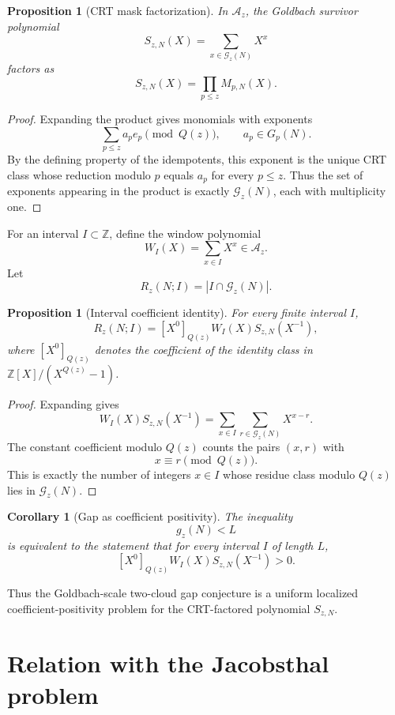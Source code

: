 \documentclass[11pt]{article}
\theoremstyle{plain}
\newtheorem{proposition}[theorem]{Proposition}
\newtheorem{corollary}[theorem]{Corollary}
\theoremstyle{definition}
\theoremstyle{remark}
\newcommand{\Z}{\mathbb Z}
\newcommand{\G}{\mathcal G}
\newcommand{\A}{\mathcal A}
\begin{document}
\begin{proposition}[CRT mask factorization]
\label{prop:mask_factorization}
In \(\A_z\), the Goldbach survivor polynomial
\[
S_{z,N}(X)=\sum_{x\in\G_z(N)}X^x
\]
factors as
\[
S_{z,N}(X)=\prod_{p\le z}M_{p,N}(X).
\]
\end{proposition}

\begin{proof}
Expanding the product gives monomials with exponents
\[
\sum_{p\le z}a_p e_p\pmod{Q(z)},
\qquad a_p\in G_p(N).
\]
By the defining property of the idempotents, this exponent is the unique CRT
class whose reduction modulo \(p\) equals \(a_p\) for every \(p\le z\).  Thus the
set of exponents appearing in the product is exactly \(\G_z(N)\), each with
multiplicity one.
\end{proof}

For an interval \(I\subset\Z\), define the window polynomial
\[
W_I(X)=\sum_{x\in I}X^x\in\A_z.
\]
Let
\[
R_z(N;I)=|I\cap\G_z(N)|.
\]

\begin{proposition}[Interval coefficient identity]
\label{prop:coefficient_identity}
For every finite interval \(I\),
\[
R_z(N;I)=[X^0]_{Q(z)}W_I(X)S_{z,N}(X^{-1}),
\]
where \([X^0]_{Q(z)}\) denotes the coefficient of the identity class in
\(\Z[X]/(X^{Q(z)}-1)\).
\end{proposition}

\begin{proof}
Expanding gives
\[
W_I(X)S_{z,N}(X^{-1})=
\sum_{x\in I}\sum_{r\in\G_z(N)}X^{x-r}.
\]
The constant coefficient modulo \(Q(z)\) counts the pairs \((x,r)\) with
\[
x\equiv r\pmod{Q(z)}.
\]
This is exactly the number of integers \(x\in I\) whose residue class modulo
\(Q(z)\) lies in \(\G_z(N)\).
\end{proof}

\begin{corollary}[Gap as coefficient positivity]
\label{cor:gap_coeff}
The inequality
\[
g_z(N)<L
\]
is equivalent to the statement that for every interval \(I\) of length \(L\),
\[
[X^0]_{Q(z)}W_I(X)S_{z,N}(X^{-1})>0.
\]
\end{corollary}

Thus the Goldbach-scale two-cloud gap conjecture is a uniform localized
coefficient-positivity problem for the CRT-factored polynomial
\(S_{z,N}\).

\section{Relation with the Jacobsthal problem}
\label{sec:jacobsthal}
\end{document}
